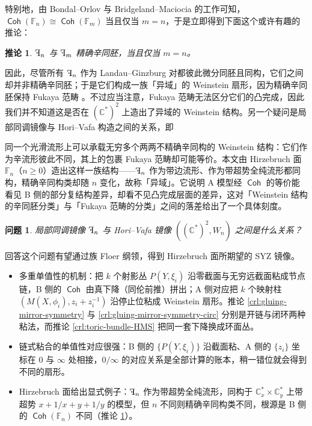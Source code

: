 \documentclass[11pt,a4paper]{article}
\DeclareMathOperator{\Coh}{\mathsf{Coh}}
\DeclareMathOperator{\rF}{\reflectbox{F}}
\theoremstyle{cnth}
\newtheorem{crl}[thm]{推论}
\newtheorem{ques}[thm]{问题}
\newif\ifshowconcept
\newenvironment{conceptbox}[1]{%
    \par\medskip
    \ifshowconcept
        \begin{tcolorbox}[enhanced, breakable,
            colback=violet!3!white, colframe=violet!55!black,
            boxrule=0.5pt, arc=2pt, left=6pt, right=6pt, top=4pt, bottom=4pt,
            title={\small\textbf{概念回顾：#1}\quad{\footnotesize（译者所加）}},
            fonttitle=\bfseries, coltitle=black, colbacktitle=violet!12!white,
            toptitle=1pt, bottomtitle=1pt]
    \fi
}{%
    \ifshowconcept
        \end{tcolorbox}%
    \fi
    \par\medskip
}
\newif\ifshowkey
\newenvironment{keytakeaways}{%
    \par\medskip
    \ifshowkey
        \begin{tcolorbox}[enhanced, breakable,
            colback=blue!3!white, colframe=blue!35!black,
            boxrule=0.5pt, arc=2pt, left=6pt, right=6pt, top=4pt, bottom=4pt,
            title={\small\textbf{本节重点}\quad{\footnotesize（译者所加）}},
            fonttitle=\bfseries, coltitle=black, colbacktitle=blue!10!white,
            toptitle=1pt, bottomtitle=1pt]
    \fi
    \begin{itemize}[leftmargin=1.4em,itemsep=0.15em,topsep=2pt]
}{%
    \end{itemize}%
    \ifshowkey
        \end{tcolorbox}%
    \fi
    \par\medskip
}
\begin{document}
特别地，由 Bondal--Orlov \cite{BO01} 与 Bridgeland--Maciocia \cite{BM01} 的工作可知，$\Coh (\mathbb{F}_n)\cong\Coh (\mathbb{F}_m)$ 当且仅当 $m=n$，于是立即得到下面这个或许有趣的推论：

\begin{crl}\label{crl:exotic-Weinstein-structure}
    $\rF_n$ 与 $\rF_m$ 精确辛同胚，当且仅当 $m=n$。
\end{crl}

因此，尽管所有 $\rF_n$ 作为 Landau--Ginzburg 对都彼此微分同胚且同构，它们之间却并非精确辛同胚；于是它们构成一族「异域」的 Weinstein 扇形，因为精确辛同胚保持 Fukaya 范畴 \cite{HS26}。不过应当注意，Fukaya 范畴无法区分它们的凸完成，因此我们并不知道这是否在 $\left(\mathbb{C}^{\ast}\right)^2$ 上造出了异域的 Weinstein 结构。另一个疑问是局部同调镜像与 Hori--Vafa 构造之间的关系，即

\begin{conceptbox}{异域 Weinstein 结构}
同一个光滑流形上可以承载无穷多个两两不精确辛同构的 Weinstein 结构：它们作为辛流形彼此不同，其上的包裹 Fukaya 范畴却可能等价。本文由 Hirzebruch 面 $\mathbb{F}_n$（$n\ge 0$）造出这样一族结构——$\rF_n$ 作为带边流形、作为带超势全纯流形都同构，精确辛同构类却随 $n$ 变化，故称「异域」。它说明 A 模型经 $\Coh$ 的等价能看见 B 侧的部分复结构差异，却看不见凸完成层面的差异，这对「Weinstein 结构的辛同胚分类」与「Fukaya 范畴的分类」之间的落差给出了一个具体刻度。
\par\smallskip{}
\end{conceptbox}

\begin{ques}\label{Q:HV-vs-LHMS}
    局部同调镜像 $\rF_n$ 与 Hori--Vafa 镜像 $\left((\mathbb{C}^{\ast})^2,W_n\right)$ 之间是什么关系？
\end{ques}

回答这个问题有望通过族 Floer 纲领，得到 Hirzebruch 面所期望的 SYZ 镜像。

\begin{keytakeaways}
  \item 多重单值性的机制：把 $k$ 个射影丛 $P(Y,\xi_i)$ 沿零截面与无穷远截面粘成节点链，B 侧的 $\Coh$ 由真下降（同伦前推）拼出；A 侧对应把 $k$ 个映射柱 $(M(X,\phi_i),z_i+z_i^{-1})$ 沿停止位粘成 Weinstein 扇形。推论 \ref{crl:gluing-mirror-symmetry} 与 \ref{crl:gluing-mirror-symmetry-circ} 分别是开链与闭环两种粘法，而推论 \ref{crl:toric-bundle-HMS} 把同一套下降换成环面丛。
  \item 链式粘合的单值性对应很强：B 侧的 $\{P(Y,\xi_i)\}$ 沿截面粘、A 侧的 $\{z_i\}$ 坐标在 $0$ 与 $\infty$ 处相接，$0/\infty$ 的对应关系是全部计算的账本，稍一错位就会得到不同的扇形。
  \item Hirzebruch 面给出显式例子：$\rF_n$ 作为带超势全纯流形，同构于 $\mathbb{C}^{\ast}_x\times\mathbb{C}^{\ast}_y$ 上带超势 $x+1/x+y+1/y$ 的模型，但 $n$ 不同则精确辛同构类不同，根源是 B 侧的 $\Coh (\mathbb{F}_n)$ 不同（推论 \ref{crl:exotic-Weinstein-structure}）。
\end{keytakeaways}
\end{document}
